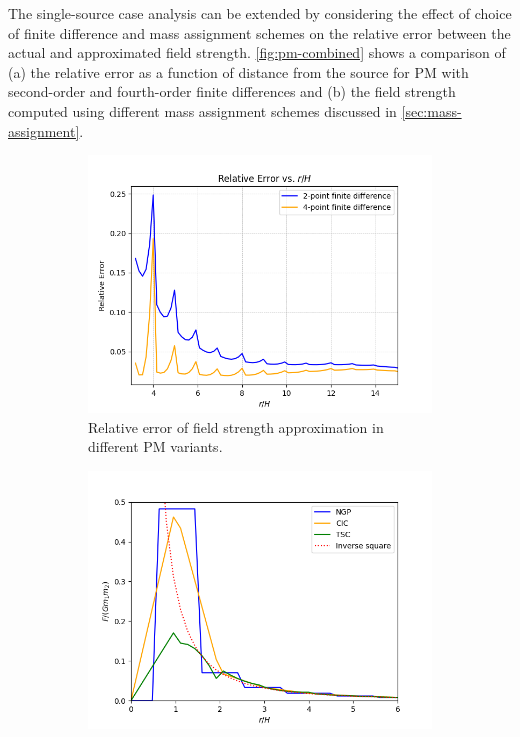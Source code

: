 The single-source case analysis can be extended by considering the effect of choice of finite difference and mass assignment schemes on the relative error between the actual and approximated field strength.
\autoref{fig:pm-combined} shows a comparison of (a) the relative error as a function of distance from the source for PM with second-order and fourth-order finite differences and (b) the field strength computed using different mass assignment schemes discussed in \autoref{sec:mass-assignment}.
\begin{figure}[htp]
    \centering
    \begin{subfigure}[t]{0.48\textwidth}
        \centering
        \includegraphics[width=\linewidth]{chapters/pm-method/img/pm-finite-diff-err.png}
        \caption{Relative error of field strength approximation in different PM variants.}
        \label{fig:pm-finite-diff-err}
    \end{subfigure}
    \hfill
    \begin{subfigure}[t]{0.48\textwidth}
        \centering
        \includegraphics[width=\linewidth]{chapters/pm-method/img/pm-mass-assignment.png}

\end{subfigure}
\end{figure}
